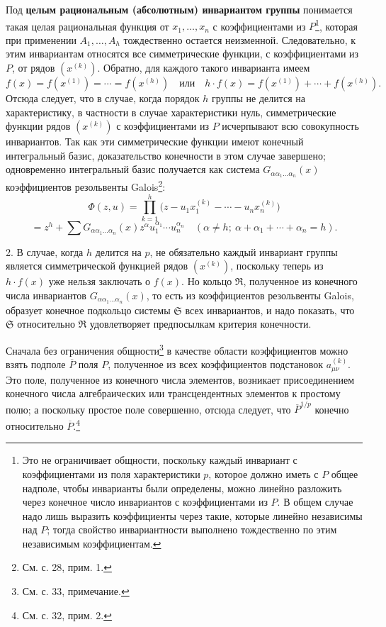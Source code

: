 \documentclass[11pt]{article}
\begin{document}
Под \textbf{целым рациональным (абсолютным) инвариантом группы} понимается такая целая рациональная функция от $x_1,\ldots,x_n$ с коэффициентами из $P$\footnote{Это не ограничивает общности, поскольку каждый инвариант с коэффициентами из поля характеристики $p$, которое должно иметь с $P$ общее надполе, чтобы инварианты были определены, можно линейно разложить через конечное число инвариантов с коэффициентами из $P$. В общем случае надо лишь выразить коэффициенты через такие, которые линейно независимы над $P$; тогда свойство инвариантности выполнено тождественно по этим независимым коэффициентам.}, которая при применении $A_1,\ldots,A_h$ тождественно остается неизменной. Следовательно, к этим инвариантам относятся все симметрические функции, с коэффициентами из $P$, от рядов $(x^{(k)})$. Обратно, для каждого такого инварианта имеем
\[
 f(x)=f(x^{(1)})=\cdots=f(x^{(h)})
 \quad\text{или}\quad
 h\cdot f(x)=f(x^{(1)})+\cdots+f(x^{(h)}).
\]
Отсюда следует, что в случае, когда порядок $h$ группы не делится на характеристику, в частности в случае характеристики нуль, симметрические функции рядов $(x^{(k)})$ с коэффициентами из $P$ исчерпывают всю совокупность инвариантов. Так как эти симметрические функции имеют конечный интегральный базис, доказательство конечности в этом случае завершено; одновременно интегральный базис получается как система $G_{\alpha\alpha_1\ldots\alpha_n}(x)$ коэффициентов резольвенты Galois\footnote{См. с. 28, прим. 1.}:
\[
 \Phi(z,u)=\prod_{k=1}^{h}\bigl(z-u_1x_1^{(k)}-\cdots-u_nx_n^{(k)}\bigr)
\]
\[
 =z^h+\sum G_{\alpha\alpha_1\ldots\alpha_n}(x)
 z^{\alpha}u_1^{\alpha_1}\cdots u_n^{\alpha_n}
 \quad(\alpha\ne h;\ \alpha+\alpha_1+\cdots+\alpha_n=h).
\]

2. В случае, когда $h$ делится на $p$, не обязательно каждый инвариант группы является симметрической функцией рядов $(x^{(k)})$, поскольку теперь из $h\cdot f(x)$ уже нельзя заключать о $f(x)$. Но кольцо $\mathfrak R$, полученное из конечного числа инвариантов $G_{\alpha\alpha_1\ldots\alpha_n}(x)$, то есть из коэффициентов резольвенты Galois, образует конечное подкольцо системы $\mathfrak S$ всех инвариантов, и надо показать, что $\mathfrak S$ относительно $\mathfrak R$ удовлетворяет предпосылкам критерия конечности.

Сначала без ограничения общности\footnote{См. с. 33, примечание.} в качестве области коэффициентов можно взять подполе $\overline P$ поля $P$, полученное из всех коэффициентов подстановок $a_{\mu\nu}^{(k)}$. Это поле, полученное из конечного числа элементов, возникает присоединением конечного числа алгебраических или трансцендентных элементов к простому полю; а поскольку простое поле совершенно, отсюда следует, что $\overline P^{1/p}$ конечно относительно $\overline P$.\footnote{См. с. 32, прим. 2.}
\end{document}
